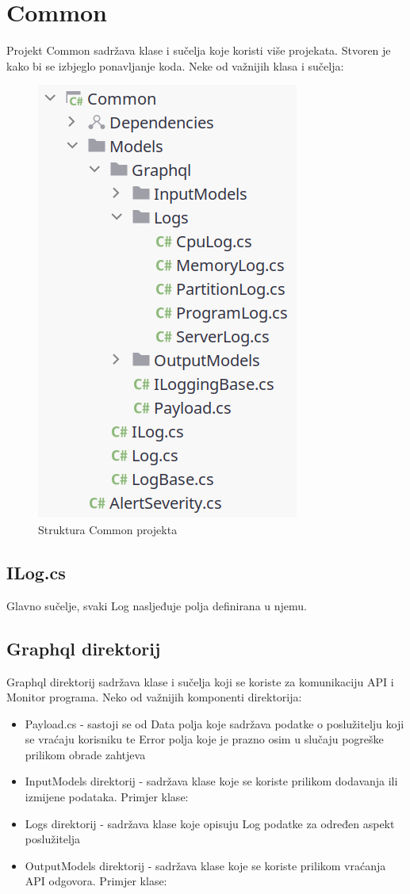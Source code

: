 \documentclass[zavrsnirad]{fer}
\begin{document}
\chapter{Common}
Projekt Common sadržava klase i sučelja koje koristi više projekata. Stvoren je kako bi se izbjeglo ponavljanje koda. Neke od važnijih klasa i sučelja:
\begin{figure}[htb!]
	\centering
	\includegraphics[width=0.4\linewidth]{images/common_structure.png} 
	\caption{Struktura Common projekta}
	\label{slk:common_structure.png}
\end{figure}

\section{ILog.cs}
Glavno sučelje, svaki Log nasljeđuje polja definirana u njemu.

\section{Graphql direktorij}
Graphql direktorij sadržava klase i sučelja koji se koriste za komunikaciju API i Monitor programa.
Neko od važnijih komponenti direktorija:
\begin{itemize}
	\item Payload.cs - sastoji se od Data polja koje sadržava podatke o poslužitelju koji se vraćaju korisniku te Error polja koje je prazno osim u slučaju pogreške prilikom obrade zahtjeva
	\item InputModels direktorij - sadržava klase koje se koriste prilikom dodavanja ili izmijene podataka. Primjer klase:
	
	\item Logs direktorij - sadržava klase koje opisuju Log podatke za određen aspekt poslužitelja
	\item OutputModels direktorij - sadržava klase koje se koriste prilikom vraćanja API odgovora. Primjer klase:
	
\end{itemize}
\end{document}
